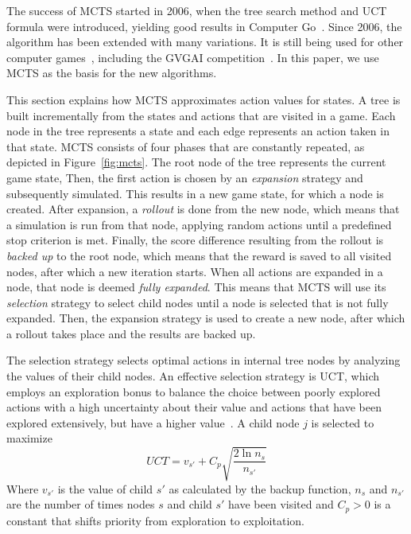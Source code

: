 \label{subsec:mcts}
The success of MCTS started in 2006, when the tree search method and UCT formula
were introduced, yielding good results in Computer
Go~\cite{gelly2006modification}. Since 2006, the algorithm has been extended
with many variations. It is still being used for other computer
games~\cite{browne2012survey}, including the GVGAI
competition~\cite{perez2014knowledge}. In this paper, we use MCTS as the basis
for the new algorithms.

This section explains how MCTS approximates action values for states.  A tree is
built incrementally from the states and actions that are visited in a game. Each
node in the tree represents a state and each edge represents an action taken in
that state. MCTS consists of four phases that are constantly repeated, as
depicted in Figure~\ref{fig:mcts}. The root node of the tree represents the
current game state, Then, the first action is chosen by an \emph{expansion}
strategy and subsequently simulated. This results in a new game state, for which
a node is created.  After expansion, a \emph{rollout} is done from the new node,
which means that a simulation is run from that node, applying random actions
until a predefined stop criterion is met. Finally, the score difference
resulting from the rollout is \emph{backed up} to the root node, which means
that the reward is saved to all visited nodes, after which a new iteration
starts.  When all actions are expanded in a node, that node is deemed
\emph{fully expanded}.  This means that MCTS will use its \emph{selection}
strategy to select child nodes until a node is selected that is not fully
expanded.  Then, the expansion strategy is used to create a new node, after
which a rollout takes place and the results are backed up.

The selection strategy selects optimal actions in internal tree nodes by
analyzing the values of their child nodes. An effective selection
strategy is UCT, which employs an exploration bonus to balance the choice
between poorly explored actions with a high uncertainty about their value and
actions that have been explored extensively, but have a higher
value~\cite{kocsis2006bandit}.  A child node $j$ is selected to maximize
\begin{equation} \label{eq:uct} UCT = v_{s'} + C_p \sqrt{\frac{2 \ln
n_s}{n_{s'}}} \end{equation} Where $v_{s'}$ is the value of child $s'$ as
calculated by the backup function, $n_s$ and $n_{s'}$ are the number of times
nodes $s$ and child $s'$ have been visited and $C_p > 0$ is a constant that
shifts priority from exploration to exploitation.

